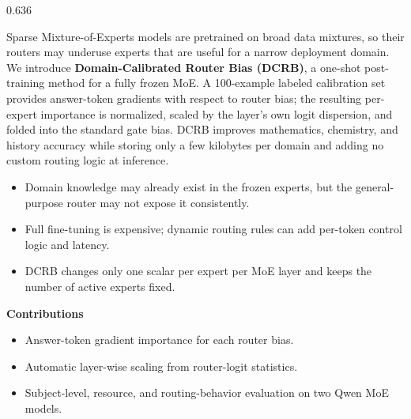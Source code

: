 \documentclass[final]{beamer}
\newcommand{\PosterSans}{\notosans}
\newenvironment{posteritems}{%
  \begin{itemize}\setlength{\itemsep}{2.0mm}\setlength{\parskip}{0pt}\setlength{\parsep}{0pt}%
}{\end{itemize}}
\begin{document}
\begin{frame}[t]
\begin{columns}[T,onlytextwidth]
\begin{column}{0.636\textwidth}
\begin{minipage}[t][88cm][s]{\linewidth}
\begin{minipage}[t]{0.492\linewidth}
\vspace{0pt}
\begin{PosterBox}[
  title={\faFile\hspace{2.5mm}Abstract},
  colframe=PosterBlue,colbacktitle=BlueTint,coltitle=PosterBlue,
  fontupper=\PosterSans\fontsize{27.8}{33.2}\selectfont]
Sparse Mixture-of-Experts models are pretrained on broad data mixtures, so their routers may underuse experts that are useful for a narrow deployment domain. We introduce \textbf{Domain-Calibrated Router Bias (DCRB)}, a one-shot post-training method for a fully frozen MoE. A 100-example labeled calibration set provides answer-token gradients with respect to router bias; the resulting per-expert importance is normalized, scaled by the layer's own logit dispersion, and folded into the standard gate bias. DCRB improves mathematics, chemistry, and history accuracy while storing only a few kilobytes per domain and adding no custom routing logic at inference.
\end{PosterBox}
\end{minipage}\hfill
\begin{minipage}[t]{0.492\linewidth}
\vspace{0pt}
\begin{PosterBox}[
  title={\faBullseye\hspace{2.5mm}Motivation and contributions},
  colframe=PosterTeal,colbacktitle=TealTint,coltitle=PosterGreen,
  fontupper=\PosterSans\fontsize{26.5}{31.8}\selectfont]
\begin{posteritems}
  \item Domain knowledge may already exist in the frozen experts, but the general-purpose router may not expose it consistently.
  \item Full fine-tuning is expensive; dynamic routing rules can add per-token control logic and latency.
  \item DCRB changes only one scalar per expert per MoE layer and keeps the number of active experts fixed.
\end{posteritems}
\vspace{0.5mm}
{\PosterSans\bfseries\fontsize{22}{26}\selectfont\color{PosterGreen}Contributions}\par
\begin{posteritems}
  \item Answer-token gradient importance for each router bias.
  \item Automatic layer-wise scaling from router-logit statistics.
  \item Subject-level, resource, and routing-behavior evaluation on two Qwen MoE models.
\end{posteritems}
\end{PosterBox}
\end{minipage}


\end{minipage}
\end{column}
\end{columns}
\end{frame}
\end{document}
